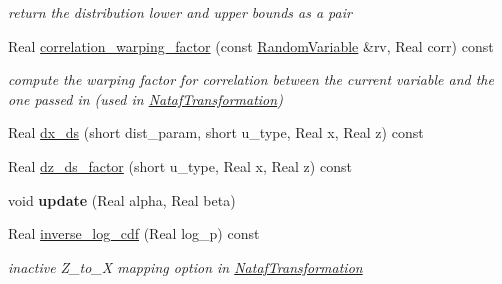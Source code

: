 \begin{DoxyCompactItemize}
\begin{DoxyCompactList}\small\item\em return the distribution lower and upper bounds as a pair \end{DoxyCompactList}\item 
Real \hyperlink{classPecos_1_1GumbelRandomVariable_a9ee48b3ca93459136b2e73f77873c4aa}{correlation\+\_\+warping\+\_\+factor} (const \hyperlink{classPecos_1_1RandomVariable}{Random\+Variable} \&rv, Real corr) const \label{classPecos_1_1GumbelRandomVariable_a9ee48b3ca93459136b2e73f77873c4aa}

\begin{DoxyCompactList}\small\item\em compute the warping factor for correlation between the current variable and the one passed in (used in \hyperlink{classPecos_1_1NatafTransformation}{Nataf\+Transformation}) \end{DoxyCompactList}\item 
Real \hyperlink{classPecos_1_1GumbelRandomVariable_af889af8adfb262c9b74f573b2a9ffc99}{dx\+\_\+ds} (short dist\+\_\+param, short u\+\_\+type, Real x, Real z) const 
\item 
Real \hyperlink{classPecos_1_1GumbelRandomVariable_af6b5fc528523180bed5fc3008dcea205}{dz\+\_\+ds\+\_\+factor} (short u\+\_\+type, Real x, Real z) const 
\item 
void {\bfseries update} (Real alpha, Real beta)\label{classPecos_1_1GumbelRandomVariable_aaa82eccfdca4d440a4e2d4a890b0d9ed}

\item 
Real \hyperlink{classPecos_1_1GumbelRandomVariable_a065b031fb613138ede20895562efc61f}{inverse\+\_\+log\+\_\+cdf} (Real log\+\_\+p) const \label{classPecos_1_1GumbelRandomVariable_a065b031fb613138ede20895562efc61f}

\begin{DoxyCompactList}\small\item\em inactive Z\+\_\+to\+\_\+X mapping option in \hyperlink{classPecos_1_1NatafTransformation}{Nataf\+Transformation} \end{DoxyCompactList}\end{DoxyCompactItemize}
